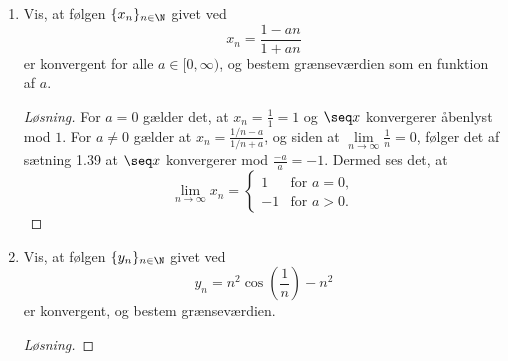 \begin{opg}\hfill
	\begin{enumerate}
		\item Vis, at f\o{}lgen $\{x_n\}_{n\in\N}$ givet ved
		\[
		x_n=\frac{1-an}{1+an}
		\]	
		er konvergent for alle $a\in [0,\infty)$, og bestem gr\ae{}nsev\ae{}rdien som en funktion af $a$.
		
		\ifanswers \begin{proof}[Løsning]
			For $ a=0 $ gælder det, at $ x_n=\frac{1}{1}=1 $ og $ \seq x $ konvergerer åbenlyst mod $ 1 $. For $ a\neq 0 $ gælder at $ x_n=\frac{1/n-a}{1/n+a} $, og siden at $ \lim\limits_{n\to\infty}\frac{1}{n}=0 $, følger det af sætning 1.39 at $ \seq x $ konvergerer mod $ \frac{-a}{a}=-1 $. Dermed ses det, at \begin{equation}
			\lim\limits_{n\to\infty}x_n=\begin{cases}
			1& \text{for }a=0,\\
			-1&\text{for }a>0.
			\end{cases}
			\end{equation}
		\end{proof} \fi
		
		
		\item Vis, at f\o{}lgen $\{y_n\}_{n\in\N}$ givet ved
		\[
		y_n=n^2\cos\left(\frac1n\right)-n^2
		\]	
		er konvergent, og bestem gr\ae{}nsev\ae{}rdien.
		
		\ifanswers \begin{proof}[Løsning]


\end{proof}
\end{enumerate}
\end{opg}
